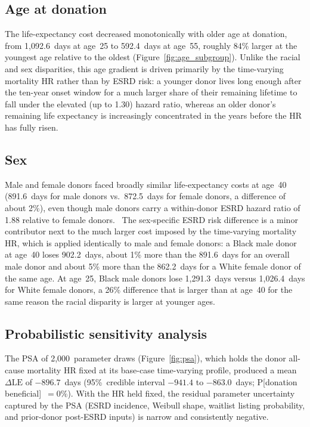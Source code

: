 \subsection{Age at donation}
\label{sec:results-age}
The life-expectancy cost decreased monotonically with older age at donation, from 1{,}092.6~days at age~25 to 592.4~days at age~55, roughly 84\% larger at the youngest age relative to the oldest (Figure~\ref{fig:age_subgroup}). Unlike the racial and sex disparities, this age gradient is driven primarily by the time-varying mortality HR rather than by ESRD risk: a younger donor lives long enough after the ten-year onset window for a much larger share of their remaining lifetime to fall under the elevated (up to 1.30) hazard ratio, whereas an older donor's remaining life expectancy is increasingly concentrated in the years before the HR has fully risen.

\subsection{Sex}
Male and female donors faced broadly similar life-expectancy costs at age~40 (891.6~days for male donors vs.\ 872.5~days for female donors, a difference of about 2\%), even though male donors carry a within-donor ESRD hazard ratio of 1.88 relative to female donors.~\cite{massie_quantifying_2017} The sex-specific ESRD risk difference is a minor contributor next to the much larger cost imposed by the time-varying mortality HR, which is applied identically to male and female donors: a Black male donor at age~40 loses 902.2~days, about 1\% more than the 891.6~days for an overall male donor and about 5\% more than the 862.2~days for a White female donor of the same age. At age~25, Black male donors lose 1{,}291.3~days versus 1{,}026.4~days for White female donors, a 26\% difference that is larger than at age~40 for the same reason the racial disparity is larger at younger ages.

\subsection{Probabilistic sensitivity analysis}
The PSA of 2,000~parameter draws (Figure~\ref{fig:psa}), which holds the donor all-cause mortality HR fixed at its base-case time-varying profile, produced a mean $\Delta\text{LE}$ of $-896.7$~days (95\%~credible interval $-941.4$ to $-863.0$~days; P[donation beneficial]~$= 0\%$). With the HR held fixed, the residual parameter uncertainty captured by the PSA (ESRD incidence, Weibull shape, waitlist listing probability, and prior-donor post-ESRD inputs) is narrow and consistently negative.

